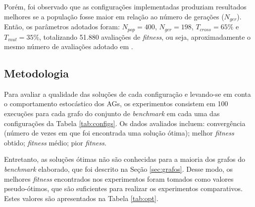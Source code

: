 \documentclass[fleqn,10pt]{SelfArx} %
\begin{document}
Porém, foi observado que as configurações implementadas produziam resultados melhores se a população fosse maior em relação ao número de gerações ($N_{ger}$). Então, os parâmetros adotados foram: $N_{pop} = 400$, $N_{ger} = 198$, $T_{cross} = 65\%$ e $T_{mut} = 35\%$, totalizando 51.880 avaliações de \textit{fitness}, ou seja, aproximadamente o mesmo número de avaliações adotado em \cite{Morady}.

\subsection{Metodologia}

Para avaliar a qualidade das soluções de cada configuração e levando-se em conta o comportamento estocástico dos AGs, os experimentos consistem em 100 execuções para cada grafo do conjunto de \textit{benchmark} em cada uma das configurações da Tabela \ref{tab:configs}. Os dados avaliados incluem: convergência (número de vezes em que foi encontrada uma solução ótima); melhor \textit{fitness} obtido; \textit{fitness} médio; pior \textit{fitness}.

Entretanto, as soluções ótimas não são conhecidas para a maioria dos grafos do \textit{benchmark} elaborado, que foi descrito na Seção \ref{sec:grafos}. Desse modo, os melhores \textit{fitness} encontrados nos experimentos foram tomados como valores pseudo-ótimos, que são suficientes para realizar os experimentos comparativos. Estes valores são apresentados na Tabela \ref{tab:opt}.

 
\end{document}
